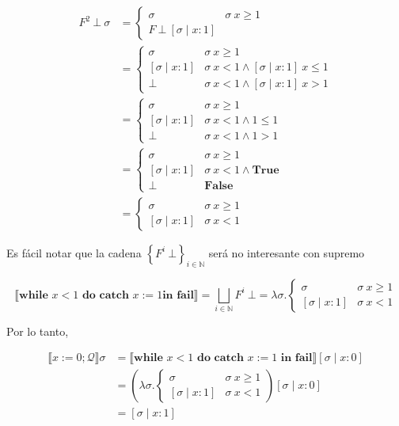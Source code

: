\documentclass[article, 12pt]{article}
\begin{document}
\begin{align*}
  F^2 ~ \bot  ~ \sigma
  &=\begin{cases}
    \sigma & \sigma ~ x \geq 1 \\ 
    F ~ \bot ~ [\sigma \mid x : 1]
  \end{cases} \\ 
  &=\begin{cases}
    \sigma & \sigma ~ x \geq 1 \\ 
    [\sigma \mid x : 1] & \sigma ~ x < 1 \land [\sigma \mid x : 1] ~ x \leq 1 \\ 
    \bot & \sigma ~ x < 1 \land [\sigma \mid x : 1] ~ x > 1
  \end{cases} \\ 
  &=\begin{cases}
    \sigma & \sigma ~ x \geq 1 \\ 
    [\sigma \mid x : 1] & \sigma ~ x < 1 \land 1 \leq 1 \\ 
    \bot & \sigma ~ x < 1 \land 1 > 1
  \end{cases}\\
  &=\begin{cases}
    \sigma & \sigma ~ x \geq 1 \\ 
    [\sigma \mid x : 1] & \sigma ~ x < 1 \land \textbf{True} \\ 
    \bot & \textbf{False}
  \end{cases}\\ 
  &=\begin{cases}
    \sigma & \sigma ~ x \geq 1 \\ 
    [\sigma \mid x : 1] & \sigma ~ x < 1 
  \end{cases}
\end{align*} 

Es fácil notar que la cadena $\left\{ F^i ~ \bot \right\}_{i \in \mathbb{N}} $
será no interesante con supremo 

\begin{equation*}
  \llbracket \textbf{while } x < 1 \textbf{ do } \textbf{catch } x :=1 \textbf{
  in fail} \rrbracket = \bigsqcup_{i \in \mathbb{N}} F^i ~ \bot  =
  \lambda\sigma.\begin{cases}
    \sigma & \sigma ~ x \geq 1 \\ 
    [\sigma \mid x : 1] & \sigma ~ x < 1
  \end{cases}
\end{equation*}

Por lo tanto, 

\begin{align*}
  \llbracket x:=0;\mathcal{Q} \rrbracket\sigma  
  &= \llbracket \textbf{while } x < 1 \textbf{ do } \textbf{catch } x := 1
  \textbf{ in fail} \rrbracket[\sigma \mid x : 0] \\ 
  &=\left( \lambda\sigma.\begin{cases}
      \sigma & \sigma ~ x \geq 1 \\ 
      [\sigma \mid x : 1] &\sigma~ x < 1
  \end{cases} \right) [\sigma \mid x : 0] \\ 
  &=[\sigma \mid x : 1]
\end{align*}
\end{document}
